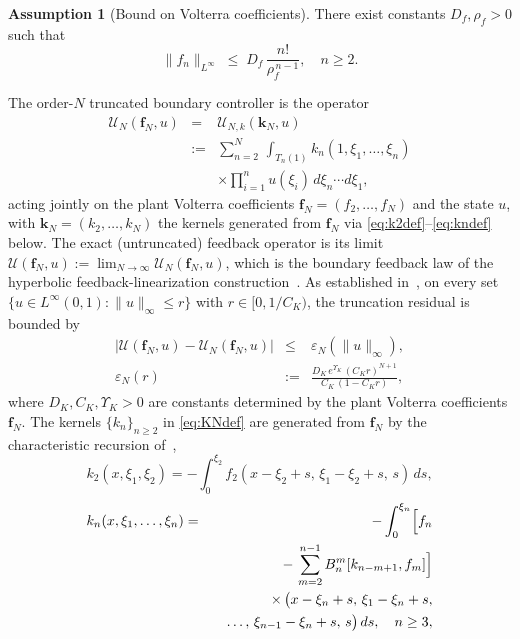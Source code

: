 \documentclass[twocolumn,amsthm]{autart}
\newcommand{\Linf}{L^\infty}
\newcommand{\eps}{\varepsilon}
\theoremstyle{plain}
\theoremstyle{definition}
\newtheorem{assumption}{Assumption}
\begin{document}
\begin{assumption}[Bound on Volterra coefficients]
\label{ass:fnbound}
There exist constants $D_f, \rho_f > 0$ such that
\begin{equation}
\|f_n\|_{\Linf} \;\le\; D_f\,\frac{n!}{\rho_f^{\,n-1}},
\quad n \ge 2.
\label{eq:fnbound}
\end{equation}
\end{assumption}

The order-$N$ truncated boundary controller is the operator
\begin{eqnarray}
\mathcal{U}_N(\mathbf{f}_N, u)
&=& \mathcal{U}_{N,k}(\mathbf{k}_N, u) \nonumber \\
&:=& \sum_{n=2}^{N}\, \int_{T_n(1)} k_n(1,\xi_1,\ldots,\xi_n) \nonumber \\
&& \times \prod_{i=1}^{n} u(\xi_i)\, d\xi_n\cdots d\xi_1,
\label{eq:KNdef}
\end{eqnarray}
acting jointly on the plant Volterra coefficients $\mathbf{f}_N = (f_2, \ldots, f_N)$ and the state $u$, with $\mathbf{k}_N = (k_2, \ldots, k_N)$ the kernels generated from $\mathbf{f}_N$ via \eqref{eq:k2def}--\eqref{eq:kndef} below. The exact (untruncated) feedback operator is its limit $\mathcal{U}(\mathbf{f}_N, u) := \lim_{N\to\infty} \mathcal{U}_N(\mathbf{f}_N, u)$, which is the boundary feedback law of the hyperbolic feedback-linearization construction~\cite{krstic2026feedbacklinearizationhyperbolicpdes}. As established in~\cite{krstic2026feedbacklinearizationhyperbolicpdes-trunc}, on every set $\{u \in \Linf(0,1) : \|u\|_\infty \le r\}$ with $r \in [0, 1/C_K)$, the truncation residual is bounded by
\begin{eqnarray}
|\mathcal{U}(\mathbf{f}_N, u) - \mathcal{U}_N(\mathbf{f}_N, u)| &\le& \eps_N(\|u\|_\infty), \nonumber \\
\eps_N(r) &:=& \frac{D_K\, e^{\Upsilon_K}\, (C_K r)^{N+1}}{C_K\,(1 - C_K r)},
\label{eq:epsN-def}
\end{eqnarray}
where $D_K, C_K, \Upsilon_K > 0$ are constants determined by the plant Volterra coefficients $\mathbf{f}_N$. The kernels $\{k_n\}_{n\ge 2}$ in \eqref{eq:KNdef} are generated from $\mathbf{f}_N$ by the characteristic recursion of~\cite{krstic2026feedbacklinearizationhyperbolicpdes},
\begin{equation}
k_2(x,\xi_1,\xi_2) = -\int_0^{\xi_2} f_2(x-\xi_2+s,\, \xi_1-\xi_2+s,\, s)\, ds,
\label{eq:k2def}
\end{equation}
\begin{eqnarray}
k_n(x,\xi_1,\ldots,\xi_n) &=& -\int_0^{\xi_n}\Bigl[f_n \nonumber \\
&& -\, \sum_{m=2}^{n-1} B_n^m[k_{n-m+1},f_m]\Bigr] \nonumber \\
&& \times\, \bigl(x-\xi_n+s,\, \xi_1-\xi_n+s, \nonumber \\
&& \quad \ldots,\, \xi_{n-1}-\xi_n+s,\, s\bigr)\, ds, \quad n\ge 3,
\label{eq:kndef}
\end{eqnarray}
\end{document}
